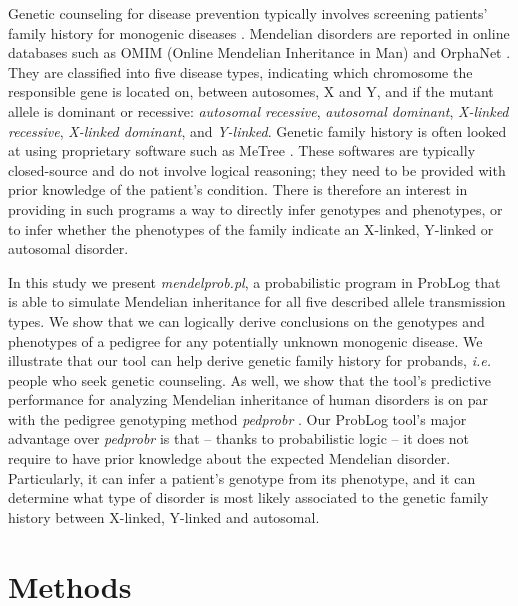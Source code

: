 \documentclass{eptcs}
\begin{document}
Genetic counseling for disease prevention typically involves screening patients' family history for monogenic diseases \cite{gordon_future_2018, bennett_practical_2011}. Mendelian disorders are reported in online databases such as OMIM (Online Mendelian Inheritance in Man) and OrphaNet \cite{hamosh_online_2005, pavan_clinical_2017}. They are classified into five disease types, indicating which chromosome the responsible gene is located on, between autosomes, X and Y, and if the mutant allele is {dominant} or {recessive}: \textit{autosomal recessive}, \textit{autosomal dominant}, \textit{X-linked recessive}, \textit{X-linked dominant}, and \textit{Y-linked}. Genetic family history is often looked at using proprietary software such as MeTree \cite{ginsburg_family_2019}. These softwares are typically closed-source and do not involve logical reasoning; they need to be provided with prior knowledge of the patient's condition. There is therefore an interest in providing in such programs a way to directly infer genotypes and phenotypes, or to infer whether the phenotypes of the family indicate an X-linked, Y-linked or autosomal disorder.

In this study we present \textit{mendelprob.pl}, a probabilistic program in ProbLog that is able to simulate Mendelian inheritance for all five described allele transmission types. We show that we can logically derive conclusions on the genotypes and phenotypes of a pedigree for any potentially unknown monogenic disease. We illustrate that our tool can help derive genetic family history for probands, \textit{i.e.} people who seek genetic counseling. As well, we show that the tool's predictive performance for analyzing Mendelian inheritance of human disorders is on par with the pedigree genotyping method \textit{pedprobr} \cite{vigeland_pedigree_2021}. Our ProbLog tool's major advantage over \textit{pedprobr} is that -- thanks to probabilistic logic -- it does not require to have prior knowledge about the expected Mendelian disorder. Particularly, it can infer a patient's genotype from its phenotype, and it can determine what type of disorder is most likely associated to the genetic family history between X-linked, Y-linked and autosomal.

\section*{Methods}
\end{document}
